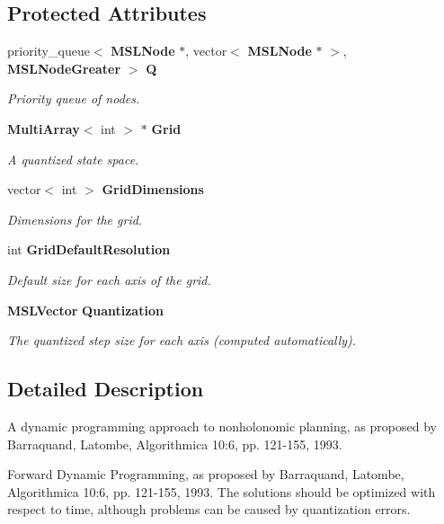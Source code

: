 \subsection*{Protected Attributes}
\begin{CompactItemize}
\item 
priority\_\-queue$<$ {\bf MSLNode} $\ast$, vector$<$ {\bf MSLNode} $\ast$ $>$, {\bf MSLNode\-Greater} $>$ {\bf Q}
\begin{CompactList}\small\item\em Priority queue of nodes.\item\end{CompactList}\item 
{\bf Multi\-Array}$<$ int $>$ $\ast$ {\bf Grid}
\begin{CompactList}\small\item\em A quantized state space.\item\end{CompactList}\item 
vector$<$ int $>$ {\bf Grid\-Dimensions}
\begin{CompactList}\small\item\em Dimensions for the grid.\item\end{CompactList}\item 
int {\bf Grid\-Default\-Resolution}
\begin{CompactList}\small\item\em Default size for each axis of the grid.\item\end{CompactList}\item 
{\bf MSLVector} {\bf Quantization}
\begin{CompactList}\small\item\em The quantized step size for each axis (computed automatically).\item\end{CompactList}\end{CompactItemize}


\subsection{Detailed Description}
A dynamic programming approach to nonholonomic planning, as proposed by Barraquand, Latombe, Algorithmica 10:6, pp. 121-155, 1993.

Forward Dynamic Programming, as proposed by Barraquand, Latombe,  Algorithmica 10:6, pp. 121-155, 1993. The solutions should be optimized  with respect to time, although problems can be caused by quantization  errors.

